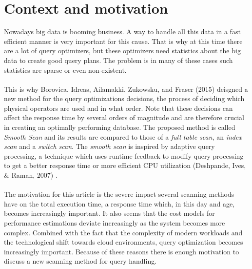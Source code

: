 \documentclass[a4paper,11pt,titlepage]{article}
\begin{document}
\section{Context and motivation}
Nowadays big data is booming business. A way to handle all this data in a fast efficient manner is very important for this cause. That is why at this time there are a lot of query optimizers, but these optimizers need statistics about the big data to create good query plans. The problem is in many of these cases such statistics are sparse or even non-existent. \\
\\
This is why Borovica, Idreas, Ailamakki, Zukowsku, and Fraser (2015) \cite{smoothscan} deisgned a new method for the query optimizations decisions, the process of deciding which physical operators are used and in what order. Note that these decisions can affect the response time by several orders of magnitude and are therefore crucial in creating an optimally performing database. The proposed method is called \emph{Smooth Scan} and its results are compared to those of a \emph{full table scan}, an \emph{index scan} and a \emph{switch scan}. The \emph{smooth scan} is inspired by adaptive query processing, a technique which uses runtime feedback to modify query processing to get a better response time or more efficient CPU utilization (Deshpande, Ives, $\&$ Raman, 2007) \cite{query}.\\
\\ 
The motivation for this article is the severe impact several scanning methods have on the total execution time, a response time which, in this day and age, becomes increasingly important. It also seems that the cost models for performance estimations deviate increasingly as the system becomes more complex. Combined with the fact that the complexity of modern workloads and the technological shift towards cloud environments, query optimization becomes increasingly important. Because of these reasons there is enough motivation to discuss a new scanning method for query handling.

\end{document}
